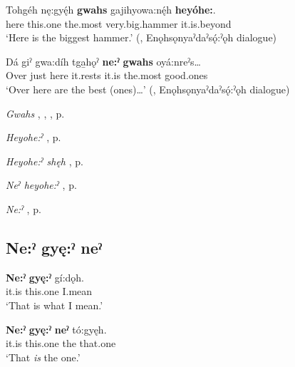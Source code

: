 \ea
\label{ex:npar69}
\gll Tohgéh nę:gyę́h \textbf{gwahs} gajihyowa:nę́h \textbf{heyóhe:}.\\
here this.one the.most very.big.hammer it.is.beyond\\
\glt ‘Here is the biggest hammer.’ (\cite[159]{mithun_watewayestanih_1984}, Enǫhsǫnyaˀdaˀsǫ́:ˀǫh dialogue)
 \z

\ea
\label{ex:npar70}
\gll Dá giˀ gwa:díh tga̱hǫˀ \textbf{ne:ˀ} \textbf{gwahs} oyá:nreˀs…\\
Over just here it.rests it.is the.most good.ones\\
\glt ‘Over here are the best (ones)…’ (\cite[159]{mithun_watewayestanih_1984}, Enǫhsǫnyaˀdaˀsǫ́:ˀǫh dialogue)

\z

\begin{CayugaRelated}
\item \textit{Gwahs} , , , p. \pageref{p:[gwahs] ‘really’}\\
\item \textit{Heyohe:ˀ} , p. \pageref{p:[heyohe:ˀ]}\\
\item \textit{Heyohe:ˀ shęh} , p. \pageref{p:[heyohe:ˀ shęh]}\\
\item \textit{Neˀ heyohe:ˀ} , p. \pageref{p:[neˀ heyohe:ˀ]}\\
\item \textit{Ne:ˀ} , p. \pageref{p:[ne:ˀ] `it is’}
\end{CayugaRelated}

\subsection*{\textbf{Ne:ˀ gyę:ˀ neˀ} } \label{p:[ne:ˀ gyę:ˀ neˀ]}

\ea
\label{ex:npar71}
\gll \textbf{Ne:ˀ} \textbf{gyę:ˀ} gí:dǫh.\\
it.is this.one I.mean\\
\glt ‘That is what I mean.’
\z

\ea
\label{ex:npar72}
\gll \textbf{Ne:ˀ} \textbf{gyę:ˀ} \textbf{neˀ} tó:gyęh.\\
it.is this.one the that.one\\
\glt ‘That \emph{is} the one.’
\z

